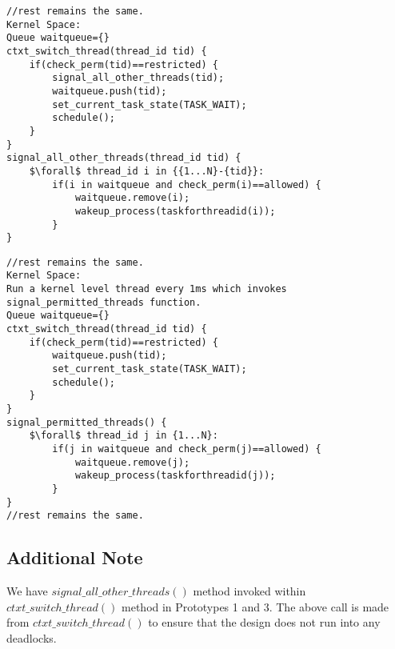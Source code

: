 \begin{lstlisting}[mathescape=true,caption={Pseudo Code for Prototype 3}, style=customc,frame=tlrb,label={lst:proto3}]
//rest remains the same.
Kernel Space:
Queue waitqueue={}
ctxt_switch_thread(thread_id tid) {	
	if(check_perm(tid)==restricted) {
		signal_all_other_threads(tid);
		waitqueue.push(tid);
		set_current_task_state(TASK_WAIT);
		schedule();
	}
}
signal_all_other_threads(thread_id tid) {
	$\forall$ thread_id i in {{1...N}-{tid}}:
		if(i in waitqueue and check_perm(i)==allowed) {
			waitqueue.remove(i);
			wakeup_process(taskforthreadid(i));
		}
}
\end{lstlisting} 
\begin{lstlisting}[mathescape=true,caption={Pseudo Code for Prototype 4}, style=customc,frame=tlrb,label={lst:proto4}]
//rest remains the same.
Kernel Space:
Run a kernel level thread every 1ms which invokes signal_permitted_threads function.
Queue waitqueue={}
ctxt_switch_thread(thread_id tid) {	
	if(check_perm(tid)==restricted) {	
		waitqueue.push(tid);
		set_current_task_state(TASK_WAIT);
		schedule();
	}
}
signal_permitted_threads() {
	$\forall$ thread_id j in {1...N}:
		if(j in waitqueue and check_perm(j)==allowed) {
			waitqueue.remove(j);
			wakeup_process(taskforthreadid(j));
		}
}
//rest remains the same.
\end{lstlisting}

\subsection*{Additional Note}

We have $signal\_all\_other\_threads()$ method invoked within $ctxt\_switch\_thread()$ method in Prototypes 1 and 3. 
The above call is made from $ctxt\_switch\_thread()$ to ensure that the design does not run into any deadlocks. 

